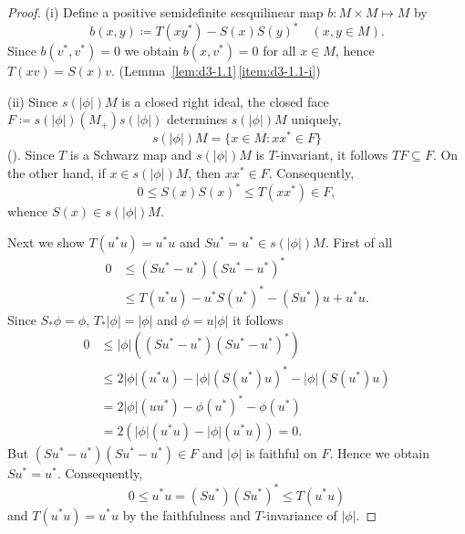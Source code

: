 \begin{proof}
(i) Define a positive semidefinite sesquilinear map $b: M\times M \mapsto M$ by
\[
b(x,y) \coloneqq T(xy^{*}) - S(x)S(y)^{*} \quad (x, y\in M).
\]
Since $b(v^{*},v^{*}) = 0$ we obtain $b(x,v^{*}) = 0$ for all $x \in M$,  hence $T(xv) = S(x)v$. (Lemma~\ref{lem:d3-1.1}\,\ref{item:d3-1.1-i})

(ii)
Since $s(|\phi|)M$ is a closed right ideal, the closed face $F \coloneqq s(|\phi|)(M_{+})s(|\phi|)$ determines $s(|\phi|)M$ uniquely, \ie
\[
s(|\phi|)M = \{x \in M \colon xx^{*} \in F\}
\]
(\citet[Theorem 1.5.2]{pedersen:1979}). 
Since $T$ is a Schwarz map and $s(|\phi|)M$ is $T$-invariant, it follows $TF \subseteq F$.
On the other hand, if $x \in s(|\phi|)M$, then $xx^{*} \in F$.
Consequently,
\[
0 \leq S(x)S(x)^{*} \leq T(xx^{*}) \in F,
\]
whence $S(x) \in s(|\phi|)M$.

Next we show $T(u^{*}u) = u^{*}u$ and $Su^{*} = u^{*} \in s(|\phi|)M$.
First of all
\begin{align*}
	0 &\leq (Su^{*} - u^{*})(Su^{*} - u^{*})^{*} \\
	& \leq T(u^{*}u) - u^{*}S(u^{*})^{*} - (Su^{*})u + u^{*}u.
\end{align*}
Since $ S_{*}\phi = \phi $, $ T_{*}|\phi| = |\phi| $ and $ \phi = u|\phi| $ it follows
\begin{align*}
	0 &\leq |\phi|((Su^{*} - u^{*})(Su^{*} - u^{*})^{*}) \\
	& \leq 2|\phi|(u^{*}u) - |\phi|(S(u^{*})u)^{*} - |\phi|(S(u^{*})u) \\
	& = 2|\phi|(uu^{*}) - \phi(u^{*})^{*} - \phi(u^{*}) \\
	& = 2(|\phi|(u^{*}u) - |\phi|(u^{*}u)) = 0.
\end{align*}
But $(Su^{*} - u^{*})(Su^{*} - u^{*}) \in F$ and $|\phi|$ is faithful on $F$.
Hence we obtain $Su^{*} = u^{*}$.
Consequently,
\[
	0 \leq u^{*}u = (Su^{*})(Su^{*})^{*} \leq T(u^{*}u)
\]
and $T(u^{*}u) = u^{*}u$ by the faithfulness and $T$-invariance of $|\phi|$.
\end{proof}
